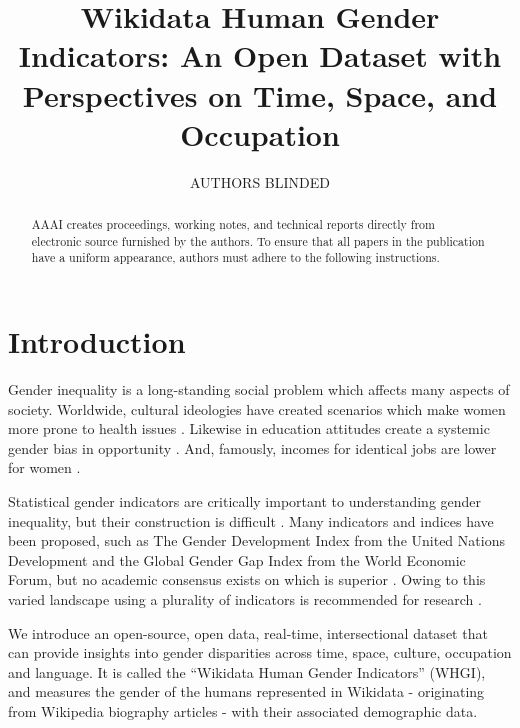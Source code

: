 \documentclass[letterpaper]{article}
\begin{document}
%
\title{Wikidata Human Gender Indicators: An Open Dataset with Perspectives on Time, Space, and Occupation}

\author{AUTHORS BLINDED}
    
\maketitle
\begin{abstract}
AAAI creates proceedings, working notes, and technical reports directly from electronic source furnished by the authors. To ensure that all papers in the publication have a uniform appearance, authors must adhere to the following instructions. 
\end{abstract}


\section{Introduction}

Gender inequality is a long-standing social problem which affects many aspects of society. Worldwide, cultural ideologies have created scenarios which make women more prone to health issues \cite{world_health_organization_women_2009}. Likewise in education attitudes create a systemic gender bias in opportunity \cite{heward_gender_1999}. And, famously, incomes for identical jobs are lower for women \cite{burstein_equal_????}.

Statistical gender indicators are critically important to understanding gender inequality, but their construction is difficult \cite{klasen_gender-related_2004}. Many indicators and indices have been proposed, such as The Gender Development Index from the United Nations Development and the Global Gender Gap Index from the World Economic Forum, but no academic consensus exists on which is superior \cite{hawken_cross-national_2012}. Owing to this varied landscape using a plurality of indicators is recommended for research \cite{jutting_measuring_2008}.

We introduce an open-source, open data, real-time, intersectional dataset that can provide insights into gender disparities across time, space, culture, occupation and language. It is called the ``Wikidata Human Gender Indicators'' (WHGI), and measures the gender of the humans represented in Wikidata - originating from Wikipedia biography articles - with their associated demographic data.
\end{document}
